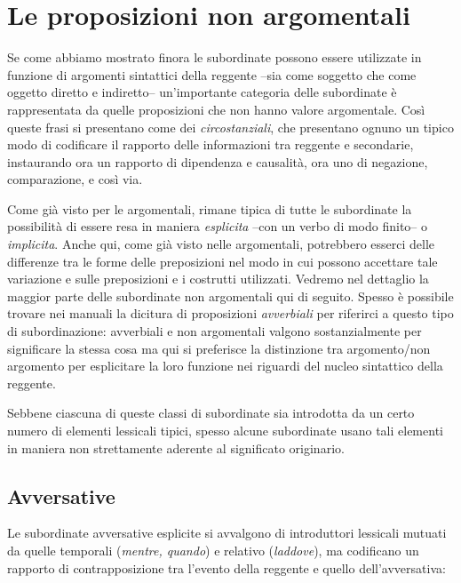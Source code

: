 \documentclass[
  a4paper,
  twoside,
  11pt,
  chapterprefix=false,
  bibliography=totocnumbered,
  listof=flat]{scrbook}
\begin{document}
\hypertarget{le-proposizioni-non-argomentali}{%
\chapter{Le proposizioni non argomentali}\label{le-proposizioni-non-argomentali}}

Se come abbiamo mostrato finora le subordinate possono essere utilizzate in funzione di argomenti sintattici della reggente --sia come soggetto che come oggetto diretto e indiretto-- un'importante categoria delle subordinate è rappresentata da quelle proposizioni che non hanno valore argomentale. Così queste frasi si presentano come dei \emph{circostanziali}, che presentano ognuno un tipico modo di codificare il rapporto delle informazioni tra reggente e secondarie, instaurando ora un rapporto di dipendenza e causalità, ora uno di negazione, comparazione, e così via.

Come già visto per le argomentali, rimane tipica di tutte le subordinate la possibilità di essere resa in maniera \emph{esplicita} --con un verbo di modo finito-- o \emph{implicita}. Anche qui, come già visto nelle argomentali, potrebbero esserci delle differenze tra le forme delle preposizioni nel modo in cui possono accettare tale variazione e sulle preposizioni e i costrutti utilizzati. Vedremo nel dettaglio la maggior parte delle subordinate non argomentali qui di seguito. Spesso è possibile trovare nei manuali la dicitura di proposizioni \emph{avverbiali} per riferirci a questo tipo di subordinazione: avverbiali e non argomentali valgono sostanzialmente per significare la stessa cosa ma qui si preferisce la distinzione tra argomento/non argomento per esplicitare la loro funzione nei riguardi del nucleo sintattico della reggente.

Sebbene ciascuna di queste classi di subordinate sia introdotta da un certo numero di elementi lessicali tipici, spesso alcune subordinate usano tali elementi in maniera non strettamente aderente al significato originario.

\hypertarget{avversative}{%
\section{Avversative}\label{avversative}}

Le subordinate avversative esplicite si avvalgono di introduttori lessicali mutuati da quelle temporali (\emph{mentre, quando}) e relativo (\emph{laddove}), ma codificano un rapporto di contrapposizione tra l'evento della reggente e quello dell'avversativa:
\end{document}
